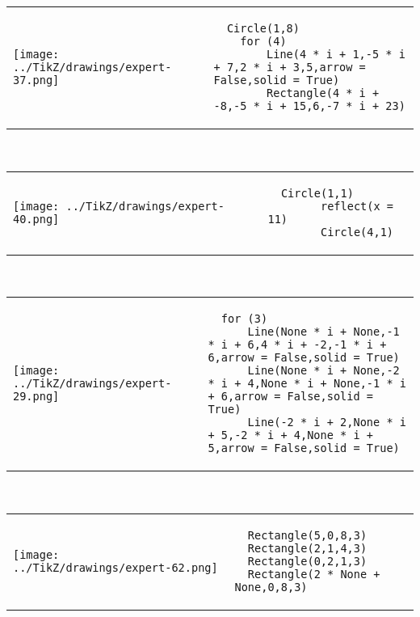         \begin{tabular}{ll}
\texttt{[image: ../TikZ/drawings/expert-37.png]}&
        \begin{minipage}{10cm}
        \begin{verbatim}
  Circle(1,8)
    for (4)
        Line(4 * i + 1,-5 * i + 7,2 * i + 3,5,arrow = False,solid = True)
        Rectangle(4 * i + -8,-5 * i + 15,6,-7 * i + 23)
        \end{verbatim}
\end{minipage}
\end{tabular}        
        \\

        \begin{tabular}{ll}
\texttt{[image: ../TikZ/drawings/expert-40.png]}&
        \begin{minipage}{10cm}
        \begin{verbatim}
  Circle(1,1)
        reflect(x = 11)
        Circle(4,1)
        \end{verbatim}
\end{minipage}
\end{tabular}        
        \\

        \begin{tabular}{ll}
\texttt{[image: ../TikZ/drawings/expert-29.png]}&
        \begin{minipage}{10cm}
        \begin{verbatim}
  for (3)
      Line(None * i + None,-1 * i + 6,4 * i + -2,-1 * i + 6,arrow = False,solid = True)
      Line(None * i + None,-2 * i + 4,None * i + None,-1 * i + 6,arrow = False,solid = True)
      Line(-2 * i + 2,None * i + 5,-2 * i + 4,None * i + 5,arrow = False,solid = True)
        \end{verbatim}
\end{minipage}
\end{tabular}        
        \\

        \begin{tabular}{ll}
\texttt{[image: ../TikZ/drawings/expert-62.png]}&
        \begin{minipage}{10cm}
        \begin{verbatim}
  Rectangle(5,0,8,3)
  Rectangle(2,1,4,3)
  Rectangle(0,2,1,3)
  Rectangle(2 * None + None,0,8,3)
        \end{verbatim}
\end{minipage}
\end{tabular}        
        \\

